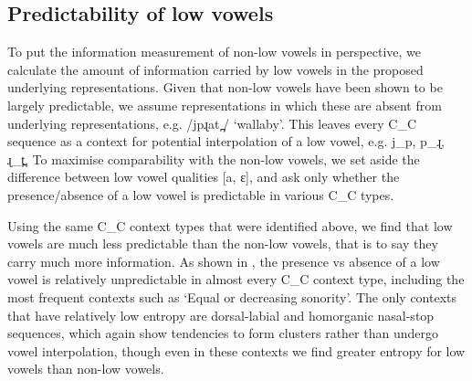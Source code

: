 \documentclass[output=paper,colorlinks,citecolor=brown]{langscibook}
\begin{document}
\subsection{Predictability of low vowels}\label{sec:mansfield:4.2}

To put the information measurement of non-low vowels in perspective, we calculate the amount of information carried by low vowels in the proposed underlying representations. Given that non-low vowels have been shown to be largely predictable, we assume representations in which these are absent from underlying representations, e.g. /jpɻat ̪/ ‘wallaby’. This leaves every C\_C sequence as a context for potential interpolation of a low vowel, e.g. j\_p, p\_ɻ, ɻ\_t̪. To maximise comparability with the non-low vowels, we set aside the difference between low vowel qualities [a, ɛ], and ask only whether the presence/absence of a low vowel is predictable in various C\_C types.

Using the same C\_C context types that were identified above, we find that low vowels are much less predictable than the non-low vowels, that is to say they carry much more information. As shown in , the presence vs absence of a low vowel is relatively unpredictable in almost every C\_C context type, including the most frequent contexts such as ‘Equal or decreasing sonority’. The only contexts that have relatively low entropy are dorsal-labial and homorganic nasal-stop sequences, which again show tendencies to form clusters rather than undergo vowel interpolation, though even in these contexts we find greater entropy for low vowels than non-low vowels.
\end{document}
